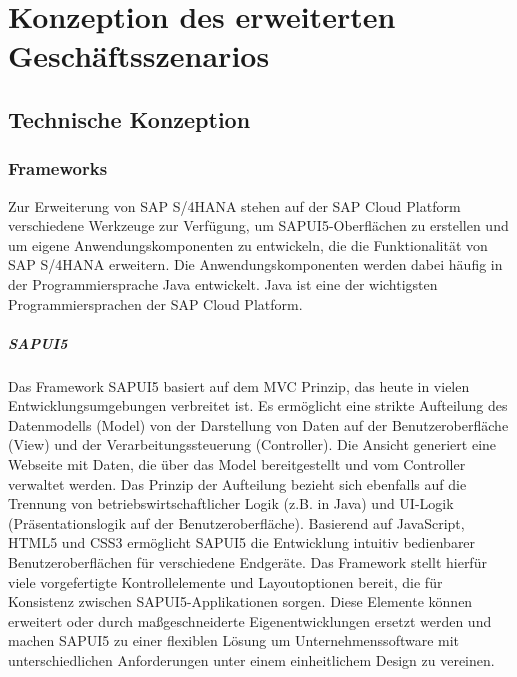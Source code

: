 \chapter{Konzeption des erweiterten Geschäftsszenarios}
\section{Technische Konzeption}
\subsection{Frameworks}
Zur Erweiterung von SAP S/4HANA stehen auf der SAP Cloud Platform verschiedene Werkzeuge zur Verfügung, um SAPUI5-Oberflächen zu erstellen und um eigene Anwendungskomponenten zu entwickeln, die die Funktionalität von SAP S/4HANA erweitern. Die Anwendungskomponenten werden dabei häufig in der Programmiersprache Java entwickelt.  Java ist eine der wichtigsten Programmiersprachen der SAP Cloud Platform.
\autocite{Schneider.2018}

\paragraph{SAPUI5} 
Das Framework SAPUI5 basiert auf dem \ac{MVC} Prinzip, das heute in vielen Entwicklungsumgebungen verbreitet ist. Es ermöglicht eine strikte Aufteilung des Datenmodells (Model) von der Darstellung von Daten auf der Benutzeroberfläche (View) und der Verarbeitungssteuerung (Controller). Die Ansicht generiert eine Webseite mit Daten, die über das Model bereitgestellt und vom Controller verwaltet werden. Das Prinzip der Aufteilung bezieht sich ebenfalls auf die Trennung von betriebswirtschaftlicher Logik (z.B. in Java) und UI-Logik (Präsentationslogik auf der Benutzeroberfläche). Basierend auf JavaScript, \ac{HTML5} und \ac{CSS3} ermöglicht SAPUI5 die Entwicklung intuitiv bedienbarer Benutzeroberflächen für verschiedene Endgeräte. Das Framework stellt hierfür viele vorgefertigte Kontrollelemente und Layoutoptionen bereit, die für Konsistenz zwischen SAPUI5-Applikationen sorgen. Diese Elemente können erweitert oder durch maßgeschneiderte Eigenentwicklungen ersetzt werden und machen SAPUI5 zu einer flexiblen Lösung um Unternehmenssoftware mit unterschiedlichen Anforderungen unter einem einheitlichem Design zu vereinen. 
\autocite{Goebels.2017}

